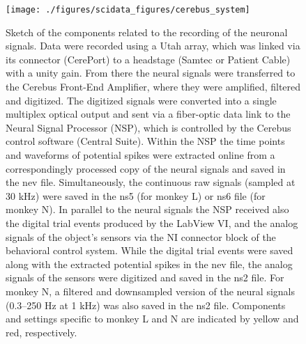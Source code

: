 \begin{figure}
 \texttt{[image: ./figures/scidata\_figures/cerebus\_system]}
 \caption[Sketch of the components related to the recording of the neuronal signals]{Sketch of the components related to the recording of the neuronal signals. Data were recorded
using a Utah array, which was linked via its connector (CerePort) to a headstage (Samtec or Patient Cable) with a unity gain. From there the neural signals were transferred to the Cerebus Front-End Amplifier, where they were amplified, filtered and digitized. The digitized signals were converted into a single multiplex optical output and sent via a fiber-optic data link to the Neural Signal Processor (NSP), which is controlled by the Cerebus control software (Central Suite). Within the NSP the time points and waveforms of potential spikes were extracted online from a correspondingly processed copy of the neural signals and saved in the nev file. Simultaneously, the continuous raw signals (sampled at 30 kHz) were saved in the ns5 (for monkey L) or ns6 file (for monkey N). In parallel to the neural signals the NSP received also the digital trial events produced by the LabView VI, and the analog signals of the object’s sensors via the NI connector block of the behavioral control system. While the digital trial events were saved along with the extracted potential spikes in the nev file,
the analog signals of the sensors were digitized and saved in the ns2 file. For monkey N, a filtered and downsampled version of the neural signals (0.3–250 Hz at 1 kHz) was also saved in the ns2 file. Components and settings specific to monkey L and N are indicated by yellow and red, respectively.}
\label{fig:cerebus_system}
\end{figure}




